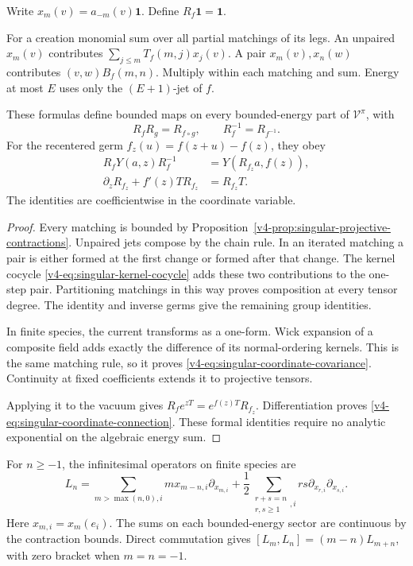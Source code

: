 Write \(x_m(v)=a_{-m}(v)\mathbf1\).
Define \(R_f\mathbf1=\mathbf1\).

For a creation
monomial sum over all partial matchings of
its legs. An unpaired \(x_m(v)\) contributes
\(\sum_{j\leq m}T_f(m,j)x_j(v)\). A pair
\(x_m(v),x_n(w)\) contributes
\((v,w)B_f(m,n)\). 
Multiply within each
matching and sum. Energy at most \(E\)
uses only the \((E+1)\)-jet of \(f\).

\begin{theorem}\label{v4-thm:singular-projective-coordinates}
These formulas define bounded maps on every
bounded-energy part of \(\mathcal V^\pi\), with
\[
 R_fR_g=R_{f\circ g},\qquad
 R_f^{-1}=R_{f^{-1}}.
\]
For the recentered germ \(f_z(u)=f(z+u)-f(z)\),
they obey
\begin{align}
 R_fY(a,z)R_f^{-1}
   &=Y(R_{f_z}a,f(z)),\label{v4-eq:singular-coordinate-covariance}\\
 \partial_zR_{f_z}+f'(z)TR_{f_z}
   &=R_{f_z}T.\label{v4-eq:singular-coordinate-connection}
\end{align}
The identities are coefficientwise in the
coordinate variable.
\end{theorem}

\begin{proof}
Every matching is bounded by
Proposition~\ref{v4-prop:singular-projective-contractions}.
Unpaired jets compose by the chain rule.
In an iterated matching a pair is either
formed at the first change or formed after
that change. The kernel cocycle
\eqref{v4-eq:singular-kernel-cocycle} adds
these two contributions to the one-step
pair. Partitioning matchings in this way
proves composition at every tensor degree.
The identity and inverse germs give the
remaining group identities.

In finite species, the current transforms
as a one-form. Wick expansion of a composite
field adds exactly the difference of its
normal-ordering kernels. This is the same
matching rule, so it proves
\eqref{v4-eq:singular-coordinate-covariance}.
Continuity at fixed coefficients extends it
to projective tensors.

Applying it to the
vacuum gives
\(R_fe^{zT}=e^{f(z)T}R_{f_z}\).
Differentiation proves
\eqref{v4-eq:singular-coordinate-connection}.
These formal identities require no analytic
exponential on the algebraic energy sum.
\end{proof}

For \(n\geq-1\), the infinitesimal operators
on finite species are
\begin{equation}\label{v4-eq:singular-Witt-operators}
 L_n=\sum_{m>\max(n,0),i}
             m x_{m-n,i}\partial_{x_{m,i}}
    +\frac12\sum_{\substack{r+s=n\\r,s\geq1},i}
             rs\partial_{x_{r,i}}\partial_{x_{s,i}}.
\end{equation}
Here \(x_{m,i}=x_m(e_i)\). The sums on each
bounded-energy sector are continuous by the
contraction bounds. Direct commutation gives
\([L_m,L_n]=(m-n)L_{m+n}\), with zero bracket
when \(m=n=-1\).

